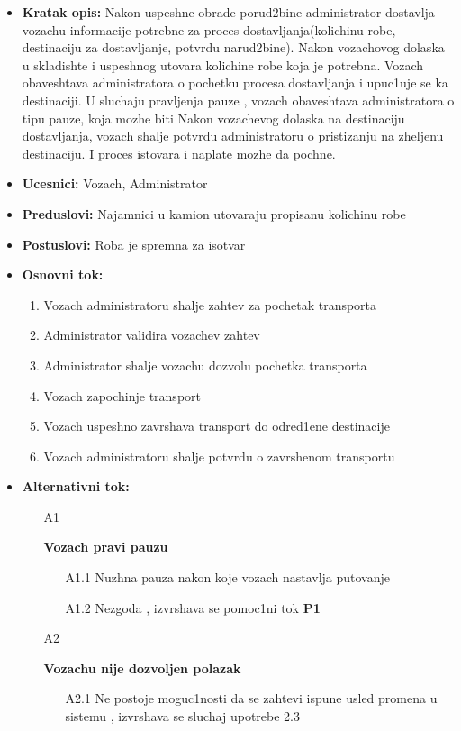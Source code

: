  \begin{itemize}
		\item {\textbf{Kratak opis:} Nakon uspeshne obrade porud2bine administrator dostavlja vozachu informacije potrebne za proces 			dostavljanja(kolichinu robe, destinaciju za dostavljanje, potvrdu narud2bine). Nakon vozachovog dolaska u skladishte i uspeshnog utovara kolichine robe koja je potrebna. Vozach obaveshtava administratora o pochetku procesa dostavljanja i upuc1uje se ka destinaciji. U sluchaju pravljenja pauze , vozach obaveshtava administratora o tipu pauze, koja mozhe biti Nakon vozachevog dolaska na destinaciju dostavljanja, vozach shalje potvrdu administratoru o pristizanju na zheljenu destinaciju. I proces istovara i naplate mozhe da pochne.}
		\item{\textbf{Ucesnici:} Vozach, Administrator}
		\item{\textbf{Preduslovi:}  Najamnici u kamion utovaraju propisanu  kolichinu robe }
		\item{\textbf{Postuslovi:}  Roba je spremna za isotvar}
		\item{\textbf{Osnovni tok:}  
			\begin{enumerate}
				\item{Vozach administratoru shalje zahtev za pochetak transporta}
				\item{Administrator validira vozachev zahtev}
				\item{Administrator shalje vozachu dozvolu pochetka transporta}
				\item{Vozach zapochinje transport }
				\item{Vozach uspeshno zavrshava transport do odred1ene destinacije}
				\item {Vozach administratoru shalje potvrdu o zavrshenom transportu}
		\end{enumerate}}
	\item{\textbf{Alternativni tok:} 
		 \begin{itemize}
			\item[A{1}]{\textbf{Vozach pravi pauzu}
				 \begin{itemize}
					\item[A{1.1}] {Nuzhna pauza nakon koje vozach nastavlja putovanje}
					\item[A{1.2}] {Nezgoda , izvrshava se pomoc1ni tok  \textbf{P{1}}}
				\end{itemize}
								} 
			\item[A{2}] {\textbf{Vozachu nije dozvoljen polazak} 
				\begin{itemize}
					\item[A{2.1}]{Ne postoje moguc1nosti da se zahtevi ispune usled promena u sistemu , izvrshava se sluchaj upotrebe 2.3}
				\end{itemize}		
		
}
\end{itemize}}
\end{itemize}
